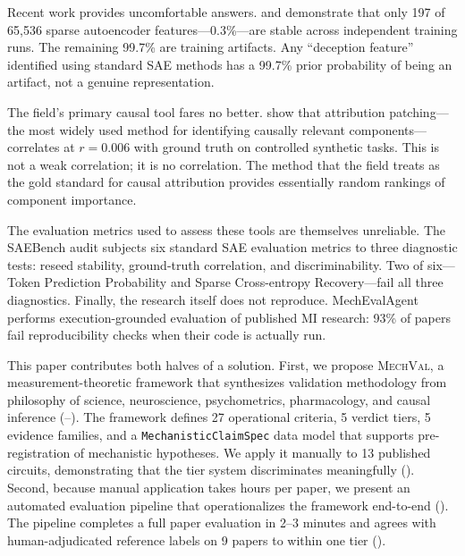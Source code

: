 \documentclass[10pt]{article}
\newcommand{\mechval}{\textsc{MechVal}}
\begin{document}
Recent work provides uncomfortable answers. \citet{bricken2024monosemanticity} and \citet{engels2025not} demonstrate that only 197 of 65,536 sparse autoencoder features---0.3\%---are stable across independent training runs. The remaining 99.7\% are training artifacts. Any ``deception feature'' identified using standard SAE methods has a 99.7\% prior probability of being an artifact, not a genuine representation.

The field's primary causal tool fares no better. \citet{kramar2024atp} show that attribution patching---the most widely used method for identifying causally relevant components---correlates at $r = 0.006$ with ground truth on controlled synthetic tasks. This is not a weak correlation; it is no correlation. The method that the field treats as the gold standard for causal attribution provides essentially random rankings of component importance.

The evaluation metrics used to assess these tools are themselves unreliable. The SAEBench audit subjects six standard SAE evaluation metrics to three diagnostic tests: reseed stability, ground-truth correlation, and discriminability. Two of six---Token Prediction Probability and Sparse Cross-entropy Recovery---fail all three diagnostics. Finally, the research itself does not reproduce. MechEvalAgent \citep{bai2026mecheval} performs execution-grounded evaluation of published MI research: 93\% of papers fail reproducibility checks when their code is actually run.

This paper contributes both halves of a solution. First, we propose \mechval{}, a measurement-theoretic framework that synthesizes validation methodology from philosophy of science, neuroscience, psychometrics, pharmacology, and causal inference (--). The framework defines 27 operational criteria, 5 verdict tiers, 5 evidence families, and a \texttt{MechanisticClaimSpec} data model that supports pre-registration of mechanistic hypotheses. We apply it manually to 13 published circuits, demonstrating that the tier system discriminates meaningfully (). Second, because manual application takes hours per paper, we present an automated evaluation pipeline that operationalizes the framework end-to-end (). The pipeline completes a full paper evaluation in 2--3 minutes and agrees with human-adjudicated reference labels on 9 papers to within one tier ().

\end{document}
